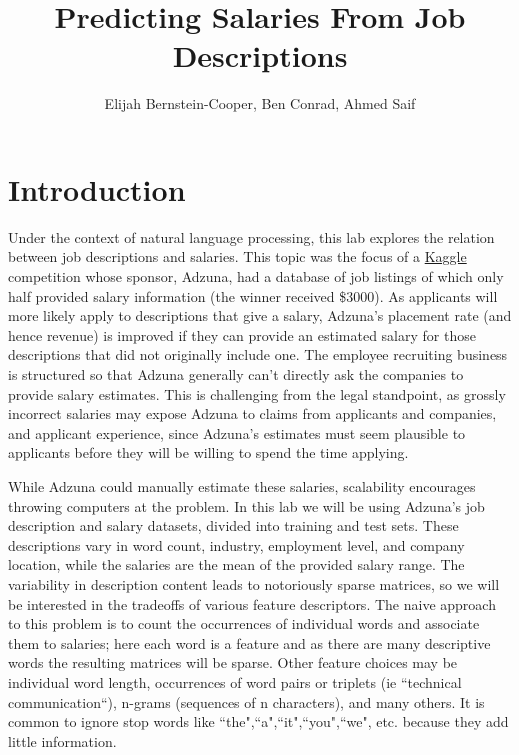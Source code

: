 \documentclass[12pt]{article}
\begin{document}
\title{Predicting Salaries From Job Descriptions}

\author{
Elijah Bernstein-Cooper, Ben Conrad, Ahmed Saif
}
\maketitle



\section{Introduction}

    Under the context of natural language processing, this lab explores the
    relation between job descriptions and salaries.  This topic was the focus
    of a \href{http://www.kaggle.com/c/job-salary-prediction}{Kaggle}
    competition whose sponsor, Adzuna, had a database of job listings of which
    only half provided salary information (the winner received \$3000).  As
    applicants will more likely apply to descriptions that give a salary,
    Adzuna's placement rate (and hence revenue) is improved if they can provide
    an estimated salary for those descriptions that did not originally include
    one. The employee recruiting business is structured so that Adzuna
    generally can't directly ask the companies to provide salary estimates.
    This is challenging from the legal standpoint, as grossly incorrect
    salaries may expose Adzuna to claims from applicants and companies, and
    applicant experience, since Adzuna's estimates must seem plausible to
    applicants before they will be willing to spend the time applying.

    While Adzuna could manually estimate these salaries, scalability encourages
    throwing computers at the problem.  In this lab we will be using Adzuna's
    job description and salary datasets, divided into training and test sets.
    These descriptions vary in word count, industry, employment level, and
    company location, while the salaries are the mean of the provided salary
    range.  The variability in description content leads to notoriously sparse
    matrices, so we will be interested in the tradeoffs of various feature
    descriptors.  The naive approach to this problem is to count the
    occurrences of individual words and associate them to salaries; here each
    word is a feature and as there are many descriptive words the resulting
    matrices will be sparse.  Other feature choices may be individual word
    length, occurrences of word pairs or triplets (ie ``technical
    communication``), n-grams (sequences of n characters), and many others. It
    is common to ignore stop words like ``the",``a",``it",``you",``we", etc.
    because they add little information.
\end{document}
